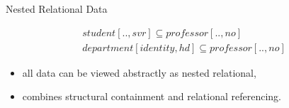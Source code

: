 

\newcommand{\nestedStudentSupervisorInclusionDependency}
{student[..,svr] \subseteq professor[..,no]}

\newcommand{\nestedHeadOfDeptInclusionDependency}
{department[identity,hd]  \subseteq professor[..,no]}

\begin{frame}{Nested Relational Data}

\begin{align*}
\nestedStudentSupervisorInclusionDependency\\
\nestedHeadOfDeptInclusionDependency  
\end{align*}
\begin{itemize}
    \item all data can be viewed abstractly as nested relational,
	\item combines structural containment and relational referencing.
\end{itemize}
\end{frame}
